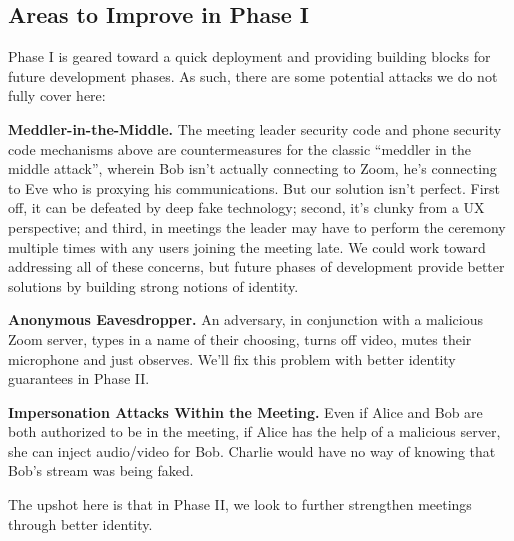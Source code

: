 \subsection{Areas to Improve in Phase I}
Phase I is geared toward a quick deployment and providing building blocks for future development phases. As such, there are some potential attacks we do not fully cover here:
\begin{description}
\item {\bf Meddler-in-the-Middle.} The meeting leader security code and phone security code mechanisms above are countermeasures for the classic ``meddler in the middle attack'', wherein Bob isn't actually connecting to Zoom, he's connecting to Eve who is proxying his communications. But our solution isn't perfect.  First off, it can be defeated by deep fake technology; second, it's clunky from a UX perspective; and third, in meetings the leader may have to perform the ceremony multiple times with any users joining the meeting late. We could work toward addressing all of these concerns, but future phases of development provide better solutions by building strong notions of identity.
\item {\bf Anonymous Eavesdropper.} An adversary, in conjunction with a malicious Zoom server, types in a name of their choosing, turns off video, mutes their microphone and just observes. We'll fix this problem with better identity guarantees in Phase II.
\item {\bf Impersonation Attacks Within the Meeting.} Even if Alice and Bob are both authorized to be in the meeting, if Alice has the help of a malicious server, she can inject audio/video for Bob. Charlie would have no way of knowing that Bob's stream was being faked.
\end{description}

The upshot here is that in Phase II, we look to further strengthen meetings through better identity.
